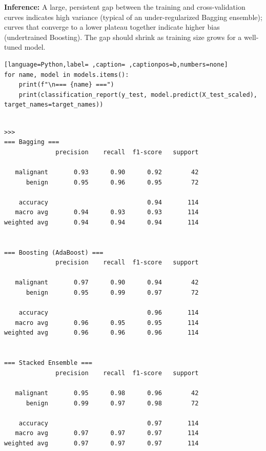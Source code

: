 \documentclass[12pt,a4paper]{article}
\begin{document}
\textbf{Inference:} A large, persistent gap between the training and cross-validation curves indicates
high variance (typical of an under-regularized Bagging ensemble); curves that converge to a
lower plateau together indicate higher bias (undertrained Boosting). The gap should shrink as
training size grows for a well-tuned model.

\begin{lstlisting}[language=Python,label= ,caption= ,captionpos=b,numbers=none]
for name, model in models.items():
    print(f"\n=== {name} ===")
    print(classification_report(y_test, model.predict(X_test_scaled), target_names=target_names))
\end{lstlisting}

\begin{verbatim}

>>> 
=== Bagging ===
              precision    recall  f1-score   support

   malignant       0.93      0.90      0.92        42
      benign       0.95      0.96      0.95        72

    accuracy                           0.94       114
   macro avg       0.94      0.93      0.93       114
weighted avg       0.94      0.94      0.94       114


=== Boosting (AdaBoost) ===
              precision    recall  f1-score   support

   malignant       0.97      0.90      0.94        42
      benign       0.95      0.99      0.97        72

    accuracy                           0.96       114
   macro avg       0.96      0.95      0.95       114
weighted avg       0.96      0.96      0.96       114


=== Stacked Ensemble ===
              precision    recall  f1-score   support

   malignant       0.95      0.98      0.96        42
      benign       0.99      0.97      0.98        72

    accuracy                           0.97       114
   macro avg       0.97      0.97      0.97       114
weighted avg       0.97      0.97      0.97       114
\end{verbatim}
\end{document}
